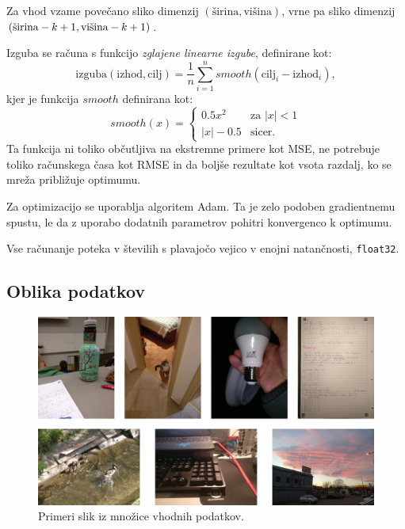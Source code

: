 \documentclass[a4paper,11pt]{article}
\begin{document}
Za vhod vzame povečano sliko dimenzij $(\text{širina}, \text{višina})$, vrne pa sliko dimenzij $(\text{širina} - k + 1,\\ \text{višina} - k + 1)$.

Izguba se računa s funkcijo \emph{zglajene linearne izgube}, definirane kot:
\begin{equation*} 
\text{izguba}(\text{izhod}, \text{cilj}) = \frac{1}{n} \sum_{i = 1}^{n} smooth(\text{cilj}_i - \text{izhod}_i),
\end{equation*}
kjer je funkcija $smooth$ definirana kot:
\begin{equation*} 
smooth(x) = \begin{cases}
	0.5 x^2 & \text{za } |x| < 1 \\
	|x| - 0.5 & \text{sicer}.
\end{cases}
\end{equation*}
Ta funkcija ni toliko občutljiva na ekstremne primere kot MSE, ne potrebuje toliko računskega časa kot RMSE in da boljše rezultate kot vsota razdalj,
	ko se mreža približuje optimumu.\cite{smooth_l1}

Za optimizacijo se uporablja algoritem Adam.
Ta je zelo podoben gradientnemu spustu, le da z uporabo dodatnih parametrov pohitri konvergenco k optimumu.\cite{adam}

Vse računanje poteka v številih s plavajočo vejico v enojni natančnosti, \texttt{float32}.

\subsection{Oblika podatkov}

\begin{figure}[htbp]
\begin{center}
\includegraphics[scale=0.285]{picture_samples.jpg}
\caption{Primeri slik iz množice vhodnih podatkov.}
\label{slika1}
\end{center}
\end{figure}
\end{document}
